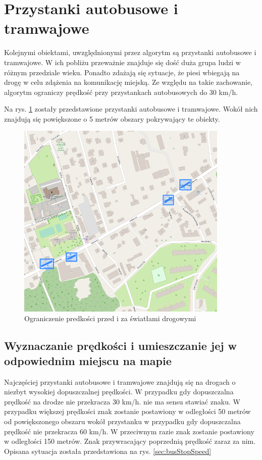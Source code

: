 \newpage
\section{Przystanki autobusowe i tramwajowe}
Kolejnymi obiektami, uwzględnionymi przez algorytm są przystanki autobusowe i tramwajowe. W ich pobliżu przeważnie znajduje się dość duża grupa ludzi w różnym przedziale wieku. Ponadto zdażają się sytuacje, że piesi wbiegają na drogę w celu zdążenia na komunikację miejską. Ze względu na takie zachowanie, algorytm ograniczy prędkość przy przystankach autobusowych do 30 km/h.

Na rys. \ref{sec:busStopBorder} zostały przedstawione przystanki autobusowe i tramwajowe. Wokół nich znajdują się powiększone o 5 metrów obszary pokrywający te obiekty.
\begin{figure}[h]
\caption{Ograniczenie predkości przed i za światłami drogowymi}
\label{sec:busStopBorder}
\centering
\includegraphics[width=0.9\textwidth]{busStopBorder}
\end{figure}


\newpage
\subsection{Wyznaczanie prędkości i umieszczanie jej w odpowiednim miejscu na mapie}

Najczęściej przystanki autobusowe i tramwajowe znajdują się na drogach o niezbyt wysokiej dopuszczalnej prędkości. W przypadku gdy dopuszczalna prędkość na drodze nie przekracza 30 km/h. nie ma sensu stawiać znaku. W przypadku większej prędkości znak zostanie postawiony w odległości 50 metrów od powiększonego obszaru wokół przystanku w przypadku gdy dopuszczalna prędkość nie przekracza 60 km/h. W przeciwnym razie znak zostanie postawiony w odległości 150 metrów. Znak przywracający poprzednią prędkość zaraz za nim. Opisana sytuacja została przedstawiona na rys. \ref{sec:busStopSpeed}

